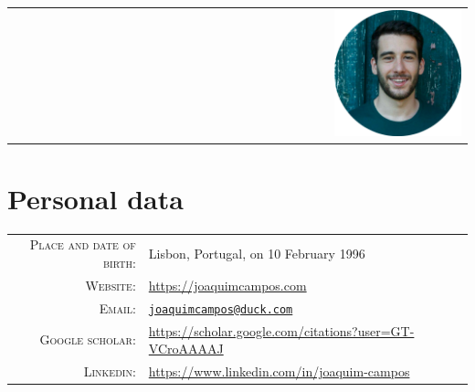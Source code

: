 \documentclass[a4paper,11pt]{article}
\begin{document}
  \pagestyle{empty}


  \begin{center}
    \begin{tabular}{lcr}
	    \par{\centering{\Huge Joaquim \textsc{Campos}}\bigskip\par} & & \includegraphics[width=0.3\textwidth]{../../images/Joaquim_circle.png} \\
    \end{tabular}
  \end{center}

  \vspace{20pt}

  \section{Personal data}

    \begin{tabular}{rl}
      \textsc{Place and date of birth:} & Lisbon, Portugal, on 10 February 1996 \\
      \textsc{Website:} & \url{https://joaquimcampos.com} \\
      \textsc{Email:} & \href{mailto:joaquimcampos@duck.com}{\nolinkurl{joaquimcampos@duck.com}} \\
      \textsc{Google scholar:} & \url{https://scholar.google.com/citations?user=GT-VCroAAAAJ} \\
      \textsc{Linkedin:} & \url{https://www.linkedin.com/in/joaquim-campos} \\
    \end{tabular}
\end{document}

